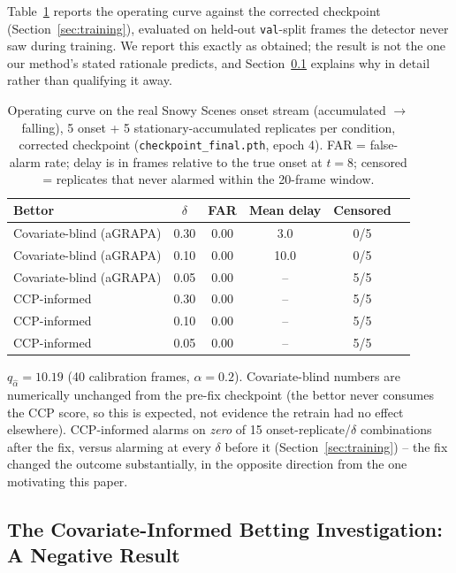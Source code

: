 Table~\ref{tab:operating-curve} reports the operating curve against the corrected checkpoint (Section~\ref{sec:training}), evaluated on held-out \texttt{val}-split frames the detector never saw during training. We report this exactly as obtained; the result is not the one our method's stated rationale predicts, and Section~\ref{sec:discussion} explains why in detail rather than qualifying it away.

\begin{table}[t]
\centering
\caption{Operating curve on the real Snowy Scenes onset stream (accumulated $\to$ falling), 5 onset + 5 stationary-accumulated replicates per condition, corrected checkpoint (\texttt{checkpoint\_final.pth}, epoch 4). FAR = false-alarm rate; delay is in frames relative to the true onset at $t=8$; censored = replicates that never alarmed within the 20-frame window.}
\label{tab:operating-curve}
\begin{threeparttable}
\begin{tabular}{@{}lccccc@{}}
\toprule
Bettor & $\delta$ & FAR & Mean delay & Censored \\
\midrule
Covariate-blind (aGRAPA) & 0.30 & 0.00 & 3.0 & 0/5 \\
Covariate-blind (aGRAPA) & 0.10 & 0.00 & 10.0 & 0/5 \\
Covariate-blind (aGRAPA) & 0.05 & 0.00 & -- & 5/5 \\
CCP-informed & 0.30 & 0.00 & -- & 5/5 \\
CCP-informed & 0.10 & 0.00 & -- & 5/5 \\
CCP-informed & 0.05 & 0.00 & -- & 5/5 \\
\bottomrule
\end{tabular}
\begin{tablenotes}
\small
\item[] $q_{\hat\alpha} = 10.19$ (40 calibration frames, $\alpha=0.2$). Covariate-blind numbers are numerically unchanged from the pre-fix checkpoint (the bettor never consumes the CCP score, so this is expected, not evidence the retrain had no effect elsewhere). CCP-informed alarms on \emph{zero} of 15 onset-replicate/$\delta$ combinations after the fix, versus alarming at every $\delta$ before it (Section~\ref{sec:training}) -- the fix changed the outcome substantially, in the opposite direction from the one motivating this paper.
\end{tablenotes}
\end{threeparttable}
\end{table}

\subsection{The Covariate-Informed Betting Investigation: A Negative Result}
\label{sec:discussion}


